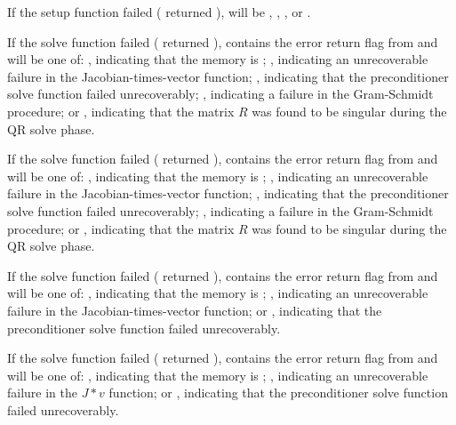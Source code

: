 {
  If the {\kinspils} setup function failed ( returned
  ),  will be
  , , 
  , or .

  If the {\kinspgmr} solve function failed ( returned
  ),  contains the error return flag from
   and will be one of:
  , indicating that the {\spgmr} memory is ;
  , indicating an unrecoverable failure in the 
  Jacobian-times-vector function;
  , indicating that the preconditioner solve
  function  failed unrecoverably;
  , indicating a failure in the Gram-Schmidt procedure; 
  or , indicating that the matrix $R$ was found to be
  singular during the QR solve phase.

  If the {\kinspfgmr} solve function failed ( returned
  ),  contains the error return flag from
   and will be one of:
  , indicating that the {\spfgmr} memory is ;
  , indicating an unrecoverable failure in the 
  Jacobian-times-vector function;
  , indicating that the preconditioner solve
  function  failed unrecoverably;
  , indicating a failure in the Gram-Schmidt procedure; 
  or , indicating that the matrix $R$ was found to be
  singular during the QR solve phase.

  If the {\kinspbcg} solve function failed ( returned
  ),  contains the error return flag from
   and will be one of:
  , indicating that the {\spbcg} memory is ;
  , indicating an unrecoverable failure in the 
  Jacobian-times-vector function; or
  , indicating that the preconditioner solve
  function  failed unrecoverably.

  If the {\kinsptfqmr} solve function failed ( returned
  ),  contains the error return flag from
   and will be one of:
  , indicating that the {\sptfqmr} memory is ;
  , indicating an unrecoverable failure in the 
  $J*v$ function; or 
  , indicating that the preconditioner solve
  function  failed unrecoverably.
}


